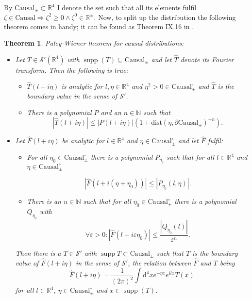 \documentclass[b5paper,draft,openbib,12pt]{memoir}
\newtheorem{Thm}[Def]{Theorem}
\DeclareMathOperator{\supp}{supp}
\begin{document}
By \(\text{Causal}_{\pm}\subset \mathbb{R}^4\) I denote the set such that all its elements fulfil \(\zeta\in \text{Causal} \Rightarrow \zeta^2\ge 0\wedge \zeta^0 \in \mathbb{R}^{\pm}\).
Now, to split up the distribution the following theorem comes in handy; it can be found as Theorem IX.16 in \cite{reed1975methods}.

\begin{Thm}\label{Paley-Wiener} Paley-Wiener theorem for causal distributions:
\begin{itemize}

\item[(A)] Let \(T\in \mathcal{S}'(\mathbb{R}^4)\) with \(\supp (T) \subseteq \text{Causal}_{\pm}\) and let \(\hat{T}\) denote its Fourier transform. Then the following is true:
\begin{itemize}
\item[(i)] \(\hat{T}(l+i\eta)\) is analytic for \(l, \eta\in\mathbb{R}^4\) and \(\eta^2>0 \in \text{Causal}^\circ_{\pm}\) and \(\hat{T}\) is the boundary value in the sense of \(\mathcal{S}'\).
\item[(ii)] There is a polynomial \(P\) and an \(n\in\mathbb{N}\) such that
\begin{equation}
\left| \hat{T}(l+i\eta) \right|\le \left| P(l+i\eta )\right| (1+ \text{dist}(\eta, \partial \text{Causal}_{\pm})^{-n}).
\end{equation}
\end{itemize}
\item[(B)] Let \(\hat{F}(l+i\eta)\) be analytic for \(l\in\mathbb{R}^4\) and \(\eta\in\text{Causal}^\circ_{\pm}\) and let \(\hat{F}\) fulfil:
\begin{itemize}
\item[(i)] For all \(\eta_0\in \text{Causal}^\circ_{\pm}\) there is a polynomial \(P_{\eta_0}\) such that for all \(l\in\mathbb{R}^4\) and \(\eta \in \text{Causal}^\circ_{\pm}\)

\begin{equation}
|\hat{F}(l+i(\eta + \eta_0))|\le | P_{\eta_0}(l,\eta)|.
\end{equation}

\item[(ii)] There is an \(n\in\mathbb{N}\) such that for all \(\eta_0\in\text{Causal}^\circ_{\pm}\) there is a polynomial \(Q_{\eta_0}\) with 
\begin{equation}
\forall \varepsilon>0: |\hat{F}(l+i \varepsilon\eta_0)|\le \frac{ | Q_{\eta_0}(l)|}{\varepsilon^n}.
\end{equation}
\end{itemize}
Then there is a \(T\in \mathcal{S}'\) with \(\supp T\subset \text{Causal}_{\pm}\) such that \(T\) is the boundary value of \(\hat{F}(l+i\eta)\) in the sense of \(\mathcal{S}'\), the relation between \(\hat{F}\) and \(T\) being
\begin{equation}
\hat{F}(l+i \eta)= \frac{1}{(2\pi)^2} \int \mathrm{d}^4x e^{-\eta x} e^{i l x} T(x)
\end{equation}
for all \(l\in\mathbb{R}^4\), \(\eta \in \text{Causal}^\circ_{\pm}\) and \(x\in \supp (T)\).
\end{itemize}
\end{Thm}
\end{document}
